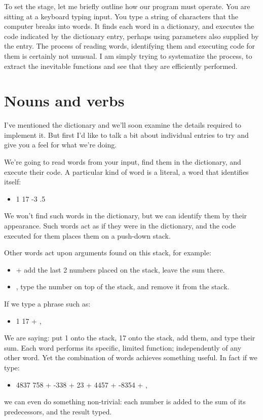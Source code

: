 \documentclass[b5paper, oneside]{book}
\begin{document}
To set the stage, let me briefly outline how our program must operate. You are sitting at a keyboard typing input. You type a string of characters that the computer breaks into words. It finds each word in a dictionary, and executes the code indicated by the dictionary entry, perhaps using parameters also supplied by the entry. The process of reading words, identifying them and executing code for them is certainly not unusual. I am simply trying to systematize the process, to extract the inevitable functions and see that they are efficiently performed.

\section{Nouns and verbs}
I've mentioned the dictionary and we'll soon examine the details required to implement it. But first I'd like to talk a bit about individual entries to try and give you a feel for what we're doing.

We're going to read words from your input, find them in the dictionary, and execute their code. A particular kind of word is a literal, a word that identifies itself:\begin{itemize}
   \item 1 17 -3 .5\end{itemize}
We won't find such words in the dictionary, but we can identify them by their appearance. Such words act as if they were in the dictionary, and the code executed for them places them on a push-down stack.

Other words act upon arguments found on this stack, for example:\begin{itemize}
   \item + add the last 2 numbers placed on the stack, leave the sum there.
   \item , type the number on top of the stack, and remove it from the stack.\end{itemize}
If we type a phrase such as:\begin{itemize}
   \item 1 17 + ,\end{itemize}
We are saying: put 1 onto the stack, 17 onto the stack, add them, and type their sum. Each word performs its specific, limited function; independently of any other word. Yet the combination of words achieves something useful. In fact if we type:\begin{itemize}
   \item 4837 758 + -338 + 23 + 4457 + -8354 + ,\end{itemize}
we can even do something non-trivial: each number is added to the sum of its predecessors, and the result typed.
\end{document}
